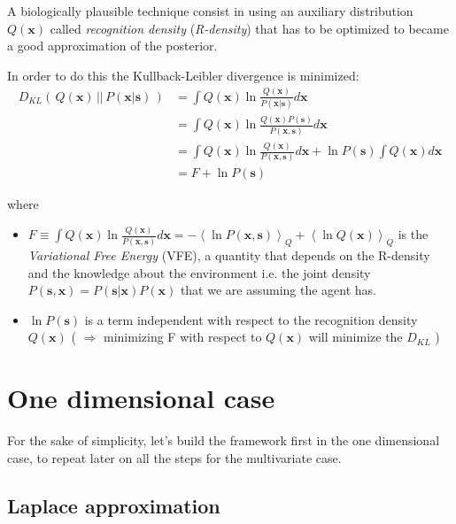 \documentclass[a4paper, 10pt]{article}
\begin{document}
A biologically plausible technique consist in using an auxiliary distribution $Q(\mathbf x)$ called \emph{recognition density} (\emph{R-density}) that has to be optimized to became a good approximation of the posterior.  

In order to do this the Kullback-Leibler  divergence is minimized:
\begin{equation}
\begin{split}
D_{KL} (\, Q(\mathbf x)\, ||\, P(\mathbf x|\mathbf s)\, ) & = \int Q(\mathbf x) \ln \frac{Q(\mathbf x)}{P(\mathbf x|\mathbf s)} d\mathbf x \\
                                  & = \int Q(\mathbf x) \ln \frac{Q(\mathbf x)P(\mathbf s)}{P(\mathbf x,\mathbf s)} d\mathbf x \\
                                  & = \int Q(\mathbf x) \ln \frac{Q(\mathbf x)}{P(\mathbf x,\mathbf s)} d\mathbf x + \ln P(\mathbf s) \int Q(\mathbf x) d\mathbf x \\
                                  & = F + \ln P(\mathbf s)
\end{split}
\end{equation}

where
\begin{itemize}

\item $F \equiv \int Q(\mathbf x) \ln \frac{Q(\mathbf x)}{P(\mathbf x,\mathbf s)}d\mathbf x = - \left< \ln P(\mathbf x,\mathbf s) \right>_{Q} + \left< \ln Q(\mathbf x) \right>_{Q}$ is the \emph{Variational Free Energy} (VFE), a quantity that depends on the R-density and the knowledge about the environment i.e. the joint density $P(\mathbf s, \mathbf x) = P(\mathbf s|\mathbf x)P(\mathbf x)$ that we are assuming the agent has. 
\item $\ln P(\mathbf s)$ is a term independent with respect to the recognition density $Q(\mathbf x)$ ( $\Rightarrow$ minimizing F with respect to $Q(\mathbf x)$ will minimize the $D_{KL}$ )

\end{itemize}

\section{One dimensional case}
\label{sec:1d}
For the sake of simplicity, let's build the framework first in the one dimensional case, to repeat later on all the steps for the multivariate case.

\subsection{Laplace approximation}
\label{sec:laplace}
\end{document}
